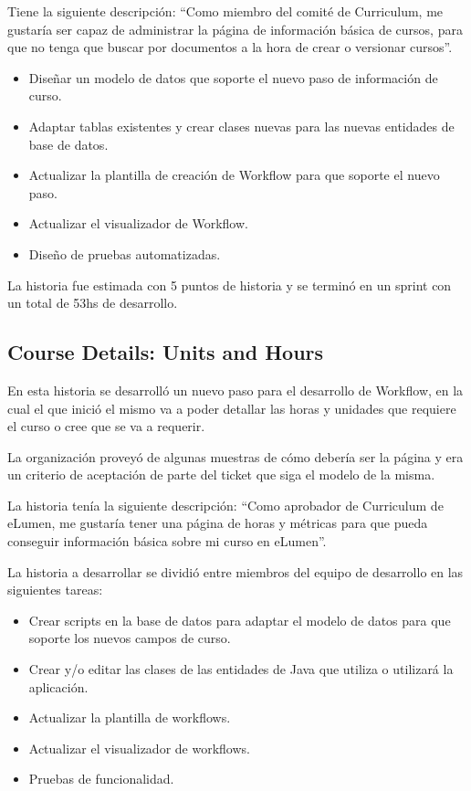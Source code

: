 Tiene la siguiente descripción: “Como miembro del comité de Curriculum, me gustaría ser capaz de administrar la página de información básica de cursos, para que no tenga que buscar por documentos a la hora de crear o versionar cursos”.

\begin{itemize}
	\item Diseñar un modelo de datos que soporte el nuevo paso de información de curso.
	\item Adaptar tablas existentes y crear clases nuevas para las nuevas entidades de base de datos.
	\item Actualizar la plantilla de creación de Workflow para que soporte el nuevo paso.
	\item Actualizar el visualizador de Workflow.
	\item Diseño de pruebas automatizadas.
\end{itemize}

La historia fue estimada con 5 puntos de historia y se terminó en un sprint con un total de 53hs de desarrollo.

\subsection{Course Details: Units and Hours}
En esta historia se desarrolló un nuevo paso para el desarrollo de Workflow, en la cual el que inició el mismo va a poder detallar las horas y unidades que requiere el curso o cree que se va a requerir.

La organización proveyó de algunas muestras de cómo debería ser la página y era un criterio de aceptación de parte del ticket que siga el modelo de la misma.

La historia tenía la siguiente descripción: “Como aprobador de Curriculum de eLumen, me gustaría tener una página de horas y métricas para que pueda conseguir información básica sobre mi curso en eLumen”.

La historia a desarrollar se dividió entre miembros del equipo de desarrollo en las siguientes tareas:
\begin{itemize}
	\item Crear scripts en la base de datos para adaptar el modelo de datos para que soporte los nuevos campos de curso.
	\item Crear y/o editar las clases de las entidades de Java que utiliza o utilizará la aplicación.
	\item Actualizar la plantilla de workflows.
	\item Actualizar el visualizador de workflows.
	\item Pruebas de funcionalidad.
\end{itemize}

